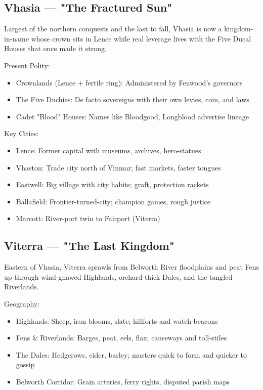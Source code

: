 \subsection{Vhasia — "The Fractured Sun"}
\label{sec:vhasia}

Largest of the northern conquests and the last to fall, Vhasia is now a kingdom-in-name whose crown sits in Lence while real leverage lives with the Five Ducal Houses that once made it strong.

Present Polity:
\begin{itemize}
    \item Crownlands (Lence + fertile ring): Administered by Fenwood's governors
    \item The Five Duchies: De facto sovereigns with their own levies, coin, and laws
    \item Cadet "Blood" Houses: Names like Bloodgood, Longblood advertise lineage
\end{itemize}

Key Cities:
\begin{itemize}
    \item Lence: Former capital with museums, archives, hero-statues
    \item Vhaston: Trade city north of Vinmar; fast markets, faster tongues
    \item Eastwell: Big village with city habits; graft, protection rackets
    \item Ballafield: Frontier-turned-city; champion games, rough justice
    \item Marcott: River-port twin to Fairport (Viterra)
\end{itemize}

\subsection{Viterra — "The Last Kingdom"}
\label{sec:viterra}

Eastern of Vhasia, Viterra sprawls from Belworth River floodplains and peat Fens up through wind-gnawed Highlands, orchard-thick Dales, and the tangled Riverlands.

Geography:
\begin{itemize}
    \item Highlands: Sheep, iron blooms, slate; hillforts and watch beacons
    \item Fens \& Riverlands: Barges, peat, eels, flax; causeways and toll-stiles
    \item The Dales: Hedgerows, cider, barley; musters quick to form and quicker to gossip
    \item Belworth Corridor: Grain arteries, ferry rights, disputed parish maps
\end{itemize}

